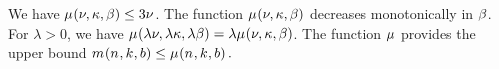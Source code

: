    \begin{observation}
    We have $\SimpleCostOf{\TheTotal,\TheLength,\BufLength}\leq 3\TheTotal$. 
        The function $\SimpleCostOf{\TheTotal,\TheLength,\BufLength}$
        decreases monotonically in $\beta$. 
        For $\lambda>0$, we have
        \(
        \SimpleCostOf{\lambda\TheTotal,\lambda\TheLength,\lambda\BufLength}
        =\lambda \SimpleCostOf{\TheTotal,\TheLength,\BufLength}
        \).
        The function $\mu_{}$ provides the upper bound 
        $
        \CostOf{\Size,\Shift,\Buffer} \leq \SimpleCostOf{\Size,\Shift,\Buffer}.
        $
  \end{observation}

